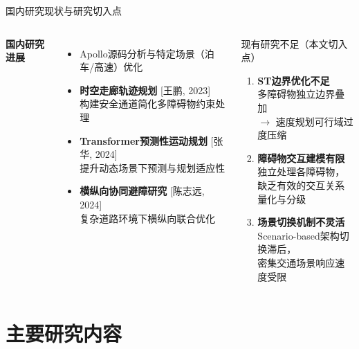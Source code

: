 \documentclass{beamer}
\begin{document}
\begin{frame}{国内研究现状与研究切入点}
  \begin{columns}[T]
    \textbf{国内研究进展}
    \begin{itemize}
      \item Apollo源码分析与特定场景（泊车/高速）优化
      \item \textbf{时空走廊轨迹规划} [王鹏, 2023]\\
            构建安全通道简化多障碍物约束处理
      \item \textbf{Transformer预测性运动规划} [张华, 2024]\\
            提升动态场景下预测与规划适应性
      \item \textbf{横纵向协同避障研究} [陈志远, 2024]\\
            复杂道路环境下横纵向联合优化
    \end{itemize}

    \begin{alertblock}{现有研究不足（本文切入点）}
      \begin{enumerate}
        \item \textbf{ST边界优化不足}\\
              多障碍物独立边界叠加\\
              $\rightarrow$ 速度规划可行域过度压缩
        \item \textbf{障碍物交互建模有限}\\
              独立处理各障碍物，\\
              缺乏有效的交互关系量化与分级
        \item \textbf{场景切换机制不灵活}\\
              Scenario-based架构切换滞后，\\
              密集交通场景响应速度受限
      \end{enumerate}
    \end{alertblock}
  \end{columns}
\end{frame}

\section{主要研究内容}
\end{document}
